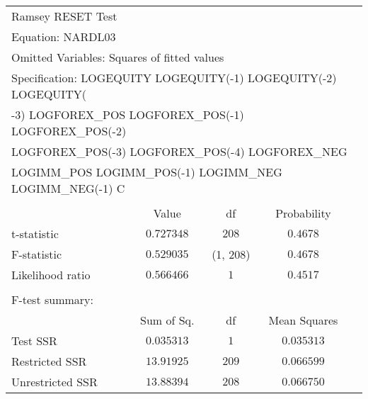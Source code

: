 \begin{tabular}{lrrrr}
\multicolumn{1}{l}{Ramsey RESET Test}&\multicolumn{1}{c}{}&\multicolumn{1}{c}{}&\multicolumn{1}{c}{}&\multicolumn{1}{c}{}\\
\multicolumn{1}{l}{Equation: NARDL03}&\multicolumn{1}{c}{}&\multicolumn{1}{c}{}&\multicolumn{1}{c}{}&\multicolumn{1}{c}{}\\
\multicolumn{3}{l}{Omitted Variables: Squares of fitted values}&\multicolumn{1}{c}{}&\multicolumn{1}{c}{}\\
\multicolumn{6}{l}{Specification: LOGEQUITY LOGEQUITY(-1) LOGEQUITY(-2) LOGEQUITY(}\\
\multicolumn{6}{l}{-3) LOGFOREX\_POS LOGFOREX\_POS(-1) LOGFOREX\_POS(-2)}\\
\multicolumn{5}{l}{LOGFOREX\_POS(-3) LOGFOREX\_POS(-4) LOGFOREX\_NEG}\\
\multicolumn{6}{l}{LOGIMM\_POS LOGIMM\_POS(-1) LOGIMM\_NEG LOGIMM\_NEG(-1) C}\\
[4.5pt] \hline \\ [-4.5pt]
\multicolumn{1}{c}{}&\multicolumn{1}{c}{Value}&\multicolumn{1}{c}{df}&\multicolumn{1}{c}{Probability}&\multicolumn{1}{c}{}\\
\multicolumn{1}{l}{t-statistic}&\multicolumn{1}{c}{$0.727348$}&\multicolumn{1}{c}{$208$}&\multicolumn{1}{c}{$0.4678$}&\multicolumn{1}{c}{}\\
\multicolumn{1}{l}{F-statistic}&\multicolumn{1}{c}{$0.529035$}&\multicolumn{1}{c}{(1, 208)}&\multicolumn{1}{c}{$0.4678$}&\multicolumn{1}{c}{}\\
\multicolumn{1}{l}{Likelihood ratio}&\multicolumn{1}{c}{$0.566466$}&\multicolumn{1}{c}{$1$}&\multicolumn{1}{c}{$0.4517$}&\multicolumn{1}{c}{}\\
[4.5pt] \hline \\ [-4.5pt]
\multicolumn{1}{l}{F-test summary:}&\multicolumn{1}{c}{}&\multicolumn{1}{c}{}&\multicolumn{1}{c}{}&\multicolumn{1}{c}{}\\
\multicolumn{1}{c}{}&\multicolumn{1}{c}{Sum of Sq.}&\multicolumn{1}{c}{df}&\multicolumn{1}{c}{Mean Squares}&\multicolumn{1}{c}{}\\
\multicolumn{1}{l}{Test SSR}&\multicolumn{1}{c}{$0.035313$}&\multicolumn{1}{c}{$1$}&\multicolumn{1}{c}{$0.035313$}&\multicolumn{1}{c}{}\\
\multicolumn{1}{l}{Restricted SSR}&\multicolumn{1}{c}{$13.91925$}&\multicolumn{1}{c}{$209$}&\multicolumn{1}{c}{$0.066599$}&\multicolumn{1}{c}{}\\
\multicolumn{1}{l}{Unrestricted SSR}&\multicolumn{1}{c}{$13.88394$}&\multicolumn{1}{c}{$208$}&\multicolumn{1}{c}{$0.066750$}&\multicolumn{1}{c}{}\\

\end{tabular}
